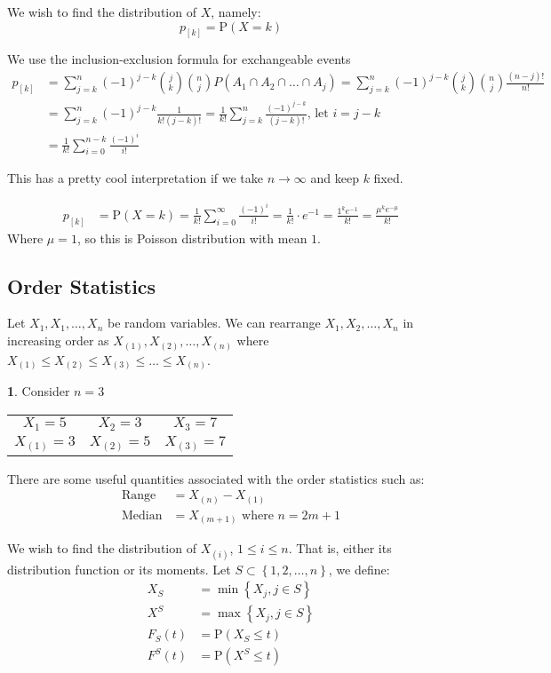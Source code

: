 \documentclass[english,12pt]{article}
\theoremstyle{plain}
\theoremstyle{definition}
\newtheorem*{example}{\protect\examplename}
\theoremstyle{definition} %
\providecommand{\examplename}{Example}
\begin{document}
We wish to find the distribution of $X$, namely:
\[p_{\left[k\right]}=\text{P}(X=k)\]

We use the inclusion-exclusion formula for exchangeable events
\begin{align*}
p_{\left[k\right]}&=\sum\limits_{j=k}^n(-1)^{j-k}{j\choose k}{n\choose j}P(A_1\cap A_2\cap\ldots\cap A_j)
=\sum\limits_{j=k}^n(-1)^{j-k}{j\choose k}{n\choose j}\frac{(n-j)!}{n!}\\
&=\sum\limits_{j=k}^n(-1)^{j-k}\frac{1}{k!(j-k)!}
=\frac{1}{k!}\sum\limits_{j=k}^n\frac{(-1)^{j-k}}{(j-k)!}\text{, let }i=j-k\\
&=\frac{1}{k!}\sum\limits_{i=0}^{n-k}\frac{(-1)^i}{i!}
\end{align*}

This has a pretty cool interpretation if we take $n\to\infty$ and keep $k$ fixed.

\begin{align*}
p_{\left[k\right]}&=\text{P}(X=k)
=\frac{1}{k!}\sum_{i=0}^\infty\frac{(-1)^i}{i!}
=\frac{1}{k!}\cdot e^{-1}
=\frac{1^ke^{-1}}{k!}
=\frac{\mu^ke^{-\mu}}{k!}
\end{align*}
Where $\mu=1$, so this is Poisson distribution with mean $1$.

\subsection*{Order Statistics}
Let $X_1,X_1,\ldots,X_n$ be random variables.  We can rearrange $X_1,X_2,\ldots,X_n$ in increasing order as $X_{(1)},X_{(2)},\ldots,X_{(n)}$ where $X_{(1)}\le X_{(2)}\le X_{(3)}\le\ldots\le X_{(n)}$.

\begin{example}
Consider $n=3$
\begin{tabular}{ccc}
$X_1=5$ & $X_2=3$ & $X_3=7$\\
$X_{(1)}=3$ & $X_{(2)}=5$ & $X_{(3)}=7$
\end{tabular}
\end{example}

There are some useful quantities associated with the order statistics such as:
\begin{align*}
\text{Range}&=X_{(n)}-X_{(1)}\\
\text{Median}&=X_{(m+1)}\text{ where }n=2m+1
\end{align*}

We wish to find the distribution of $X_{(i)}$, $1\le i\le n$.  That is, either its distribution function or its moments.  Let $S\subset\left\{1,2,\ldots,n\right\}$, we define:
\begin{align*}
X_S&=\min\left\{X_j,j\in S\right\}\\
X^S&=\max\left\{X_j,j\in S\right\}\\
F_S(t)&=\text{P}(X_S\le t)\\
F^S(t)&=\text{P}(X^S\le t)
\end{align*}
\end{document}
